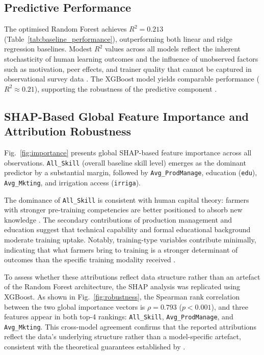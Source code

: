 \documentclass[3p,twocolumn,authoryear]{elsarticle}
\begin{document}
\subsection{Predictive Performance}

The optimised Random Forest achieves $R^{2} = 0.213$
(Table~\ref{tab:baseline_performance}), outperforming both linear and
ridge regression baselines.
Modest $R^{2}$ values across all models reflect the inherent
stochasticity of human learning outcomes and the influence of unobserved
factors such as motivation, peer effects, and trainer quality that cannot
be captured in observational survey data \citep{davis2012}.
The XGBoost model yields comparable performance
($R^{2} \approx 0.21$), supporting the robustness of the predictive
component \citep{chen2016}.

\subsection{SHAP-Based Global Feature Importance and Attribution
            Robustness}

Fig.~\ref{fig:importance} presents global SHAP-based feature importance
across all observations.
\texttt{All\_Skill} (overall baseline skill level) emerges as the
dominant predictor by a substantial margin, followed by
\texttt{Avg\_ProdManage}, education (\texttt{edu}),
\texttt{Avg\_Mkting}, and irrigation access (\texttt{irriga}).

The dominance of \texttt{All\_Skill} is consistent with human capital
theory: farmers with stronger pre-training competencies are better
positioned to absorb new knowledge \citep{feder1985}.
The secondary contributions of production management and education
suggest that technical capability and formal educational background
moderate training uptake.
Notably, training-type variables contribute minimally, indicating that
what farmers bring to training is a stronger determinant of outcomes
than the specific training modality received \citep{ryo2022}.

To assess whether these attributions reflect data structure rather than
an artefact of the Random Forest architecture, the SHAP analysis was
replicated using XGBoost.
As shown in Fig.~\ref{fig:robustness}, the Spearman rank correlation
between the two global importance vectors is $\rho = 0.793$
($p < 0.001$), and three features appear in both top-4 rankings:
\texttt{All\_Skill}, \texttt{Avg\_ProdManage}, and \texttt{Avg\_Mkting}.
This cross-model agreement confirms that the reported attributions
reflect the data's underlying structure rather than a model-specific
artefact, consistent with the theoretical guarantees established by
\citet{lundberg2020}.
\end{document}
